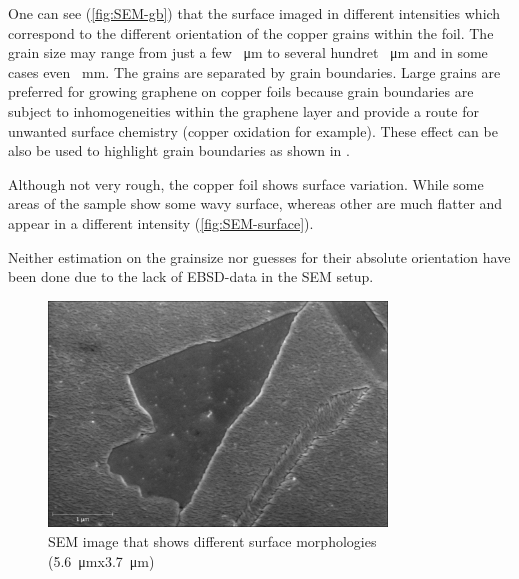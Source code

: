 One can see (\autoref{fig:SEM-gb}) that the surface imaged in different intensities which correspond to the different orientation of the copper grains within the foil\cite{wu_effects_2015}. The grain size may range from just a few \SI{}{\micro \meter} to several hundret \SI{}{\micro \meter} and in some cases even \SI{}{\milli \meter}. The grains are separated by grain boundaries. Large grains are preferred for growing graphene on copper foils because grain boundaries are subject to inhomogeneities within the graphene layer and provide a route for unwanted surface chemistry (copper oxidation for example). These effect can be also be used to highlight grain boundaries as shown in \cite{wu_effects_2015}.

Although not very rough, the copper foil shows surface variation. While some areas of the sample show some wavy surface, whereas other are much flatter and appear in a different intensity (\autoref{fig:SEM-surface}).

Neither estimation on the grainsize nor guesses for their absolute orientation have been done due to the lack of EBSD-data in the SEM setup.

\begin{figure}[]
	\begin{center}
		\includegraphics[height=6cm]{./images/Domenik_16031700.jpg}
	\end{center}
	\caption{SEM image that shows different surface morphologies (\SI{5.6}{\micro \meter}x\SI{3.7}{\micro \meter})}
	\label{fig:SEM-surface}
\end{figure}

